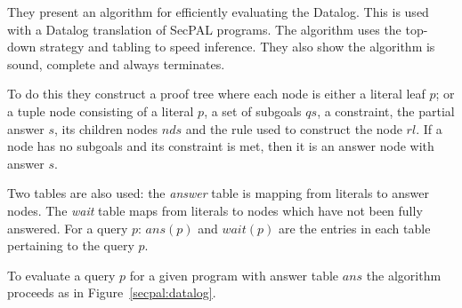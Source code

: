 \documentclass[a4paper]{article}
\begin{document}
They present an algorithm for efficiently evaluating the Datalog. This is used
with a Datalog translation of
SecPAL programs.  The algorithm uses the top-down strategy and tabling to speed
inference. They also show the algorithm is sound, complete and always
terminates. 

To do this they construct a proof tree where each node is either a literal leaf
$p$; or a tuple node consisting of a literal $p$, a set of subgoals $qs$, a
constraint, the partial answer $s$, its children nodes $nds$ and the rule used
to construct the node $rl$.  If a node has no subgoals and its constraint
is met, then it is an answer node with answer $s$.

Two tables are also used: the \emph{answer} table is mapping from literals to
answer nodes.  The \emph{wait} table maps from literals to nodes which
have not been fully answered.  For a query $p$: $ans(p)$ and $wait(p)$ are the
entries in each table pertaining to the query $p$.

To evaluate a query $p$ for a given program with answer table $ans$ the
algorithm proceeds as in Figure~\ref{secpal:datalog}.
\end{document}
